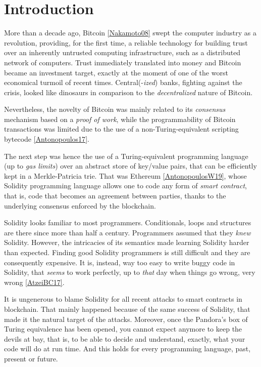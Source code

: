 \documentclass[a4paper,]{book}
\begin{document}
{

\hypertarget{introduction}{%
\chapter{Introduction }\label{introduction}}

More than a decade ago, Bitcoin
\protect\hyperlink{Nakamoto08}{{[}Nakamoto08{]}} swept the computer
industry as a revolution, providing, for the first time, a reliable
technology for building trust over an inherently untrusted computing
infrastructure, such as a distributed network of computers. Trust
immediately translated into money and Bitcoin became an investment
target, exactly at the moment of one of the worst economical turmoil of
recent times. Central(-\emph{ized}) banks, fighting against the crisis,
looked like dinosaurs in comparison to the \emph{decentralized} nature
of Bitcoin.

Nevertheless, the novelty of Bitcoin was mainly related to its
\emph{consensus} mechanism based on a \emph{proof of work}, while the
programmability of Bitcoin transactions was limited due to the use of a
non-Turing-equivalent scripting bytecode
\protect\hyperlink{Antonopoulos17}{{[}Antonopoulos17{]}}.

The next step was hence the use of a Turing-equivalent programming
language (up to \emph{gas limits}) over an abstract store of key/value
pairs, that can be efficiently kept in a Merkle-Patricia trie. That was
Ethereum \protect\hyperlink{AntonopoulosW19}{{[}AntonopoulosW19{]}},
whose Solidity programming language allows one to code any form of
\emph{smart contract}, that is, code that becomes an agreement between
parties, thanks to the underlying consensus enforced by the blockchain.

Solidity looks familiar to most programmers. Conditionals, loops and
structures are there since more than half a century. Programmers assumed
that they \emph{knew} Solidity. However, the intricacies of its
semantics made learning Solidity harder than expected. Finding good
Solidity programmers is still difficult and they are consequently
expensive. It is, instead, way too easy to write buggy code in Solidity,
that \emph{seems} to work perfectly, up to \emph{that} day when things
go wrong, very wrong \protect\hyperlink{AtzeiBC17}{{[}AtzeiBC17{]}}.

It is ungenerous to blame Solidity for all recent attacks to smart
contracts in blockchain. That mainly happened because of the same
success of Solidity, that made it the natural target of the attacks.
Moreover, once the Pandora's box of Turing equivalence has been opened,
you cannot expect anymore to keep the devils at bay, that is, to be able
to decide and understand, exactly, what your code will do at run time.
And this holds for every programming language, past, present or future.

}
\end{document}
